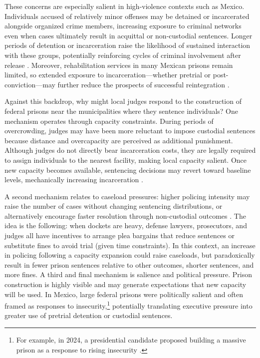 These concerns are especially salient in high-violence contexts such as Mexico. Individuals accused of relatively minor offenses may be detained or incarcerated alongside organized crime members, increasing exposure to criminal networks even when cases ultimately result in acquittal or non-custodial sentences. Longer periods of detention or incarceration raise the likelihood of sustained interaction with these groups, potentially reinforcing cycles of criminal involvement after release \citep{Pintoff}. Moreover, rehabilitation services in many Mexican prisons remain limited, so extended exposure to incarceration—whether pretrial or post-conviction—may further reduce the prospects of successful reintegration \citep{Evalua2}.

Against this backdrop, why might local judges respond to the construction of federal prisons near the municipalities where they sentence individuals? One mechanism operates through capacity constraints. During periods of overcrowding, judges may have been more reluctant to impose custodial sentences because distance and overcapacity are perceived as additional punishment. Although judges do not directly bear incarceration costs, they are legally required to assign individuals to the nearest facility, making local capacity salient. Once new capacity becomes available, sentencing decisions may revert toward baseline levels, mechanically increasing incarceration \citep{Schnepel}. 

A second mechanism relates to caseload pressures: higher policing intensity may raise the number of cases without changing sentencing distributions, or alternatively encourage faster resolution through non-custodial outcomes \citep{Yang-Resource-AEJ}. The idea is the following: when dockets are heavy, defense lawyers, prosecutors, and judges all have incentives to arrange plea bargains that reduce sentences or substitute fines to avoid trial (given time constraints). In this context, an increase in policing following a capacity expansion could raise caseloads, but paradoxically result in fewer prison sentences relative to other outcomes, shorter sentences, and more fines. A third and final mechanism is salience and political pressure. Prison construction is highly visible and may generate expectations that new capacity will be used. In Mexico, large federal prisons were politically salient and often framed as responses to insecurity,\footnote{For example, in 2024, a presidential candidate proposed building a massive prison as a response to rising insecurity \citep{FinancieroXochitl}.} potentially translating executive pressure into greater use of pretrial detention or custodial sentences.

